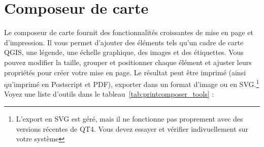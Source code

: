 \section{Composeur de carte}\label{label_printcomposer}


Le composeur de carte fournit des fonctionnalit\'es croissantes de mise en page et
d'impression. Il vous permet d'ajouter des \'el\'ements tels qu'un cadre de carte
QGIS, une l\'egende, une \'echelle graphique, des images et des \'etiquettes. Vous
pouvez modifier la taille, grouper et positionner chaque \'el\'ement et ajuster
leurs propri\'et\'es pour cr\'eer votre mise en page. Le r\'esultat peut \^etre imprim\'e
(ainsi qu'imprim\'e en Postscript et PDF), exporter dans un format d'image ou en
SVG.\footnote{L'export en SVG est g\'er\'e, mais il ne fonctionne pas proprement
avec des versions r\'ecentes de QT4. Vous devez essayer et v\'erifier
indivuellement sur votre syst\`eme} Voyez une liste d'outils dans le
tableau~\ref{tab:printcomposer_tools} :


